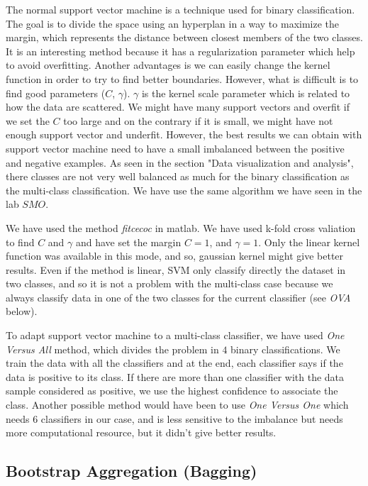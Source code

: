 \documentclass{article} %
\begin{document}
The normal support vector machine is a technique used for binary classification. The goal is to divide the space using an hyperplan in a way to maximize the margin, which represents the distance between closest members of the two classes. It is an interesting method because it has a regularization parameter which help to avoid overfitting. Another advantages is we can easily change the kernel function in order to try to find better boundaries. However, what is difficult is to find good parameters ($C$, $\gamma$). $\gamma$ is the kernel scale parameter which is related to how the data are scattered. We might have many support vectors and overfit if we set the $C$ too large and on the contrary if it is small, we might have not enough support vector and underfit. However, the best results we can obtain with support vector machine need to have a small imbalanced between the positive and negative examples. As seen in the section "Data visualization and analysis", there classes are not very well balanced as much for the binary classification as the multi-class classification. We have use the same algorithm we have seen in the lab $SMO$. 

We have used the method \textit{fitcecoc} in matlab. We have used k-fold cross valiation to find $C$ and $\gamma$ and have set the margin $C=1$, and $\gamma = 1$. Only the linear kernel function was available in this mode, and so, gaussian kernel might give better results. Even if the method is linear, SVM only classify directly the dataset in two classes, and so it is not a problem with the multi-class case because we always classify data in one of the two classes for the current classifier (see \textit{OVA} below).

To adapt support vector machine to a multi-class classifier, we have used \textit{One Versus All} method, which divides the problem in $4$ binary classifications. We train the data with all the classifiers and at the end, each classifier says if the data is positive to its class. If there are more than one classifier with the data sample considered as positive, we use the highest confidence to associate the class. Another possible method would have been to use \textit{One Versus One} which needs $6$ classifiers in our case, and is less sensitive to the imbalance but needs more computational resource, but it didn't give better results. 

\subsection{Bootstrap Aggregation (Bagging)}
\end{document}
